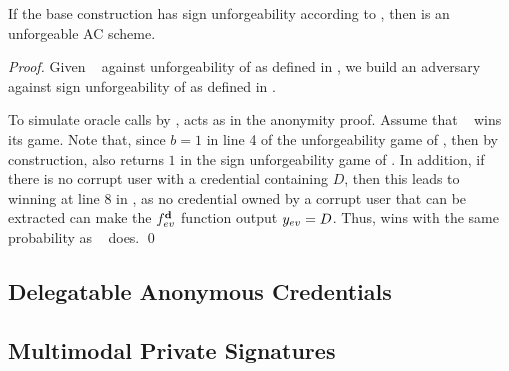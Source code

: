 \begin{theorem}
  If the base \CUASGen construction has sign unforgeability according to
  , then \CUASAC is an unforgeable AC scheme.
\end{theorem}

\begin{proof}
  Given \adv~ against unforgeability of \CUASAC as defined in \cite{fhs19}, we
  build an adversary \advB against sign unforgeability of \CUASGen as defined in
  .

  To simulate oracle calls by \adv, \advB acts as in the anonymity proof. Assume
  that \adv~ wins its game. Note that, since $b=1$ in line 4 of the
  unforgeability game of , then by construction, \Verify
  also returns $1$ in the sign unforgeability game of \UAS. In addition, if
  there is no corrupt user with a credential containing $D$, then this leads to
  \advB winning at line 8 in , as no credential
  owned by a corrupt user that can be extracted can make the $f_{ev}^{\mathbf{d}}$
  function output $y_{ev}=D$. Thus, \advB wins with the same probability as
  \adv~ does.  
  \qed
\end{proof}

\subsection{Delegatable Anonymous Credentials}
\label{sapp:related-models-dac}

\subsection{Multimodal Private Signatures}
\label{sapp:related-models-mps}


